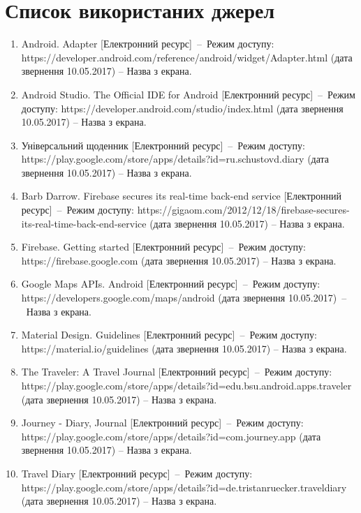 \documentclass[../main.tex]{subfiles}
\begin{document}
\chapter*{Список використаних джерел}
	
\begin{enumerate}
	\item Android. Adapter [Електронний ресурс]~–~Режим доступу: https://developer.android.com/reference/android/widget/Adapter.html (дата звернення 10.05.2017) – Назва з екрана.
	\item Android Studio. The Official IDE for Android [Електронний ресурс]~–~Режим доступу: https://developer.android.com/studio/index.html (дата звернення 10.05.2017) – Назва з екрана.
	\item Універсальний щоденник [Електронний ресурс]~–~Режим доступу: https://play.google.com/store/apps/details?id=ru.schustovd.diary (дата звернення 10.05.2017) – Назва з екрана.
	\item Barb Darrow. Firebase secures its real-time back-end service [Електронний ресурс]~–~Режим доступу: https://gigaom.com/2012/12/18/firebase-secures-its-real-time-back-end-service (дата звернення 10.05.2017) – Назва з екрана.
	\item Firebase. Getting started [Електронний ресурс]~–~Режим доступу: https://firebase.google.com (дата звернення 10.05.2017) – Назва з екрана.
	\item Google Maps APIs. Android [Електронний ресурс]~–~Режим доступу: https://developers.google.com/maps/android (дата звернення 10.05.2017)~–~Назва з екрана.
	\item Material Design. Guidelines [Електронний ресурс]~–~Режим доступу: https://material.io/guidelines (дата звернення 10.05.2017) – Назва з екрана.
	\item The Traveler: A Travel Journal [Електронний ресурс]~–~Режим доступу: https://play.google.com/store/apps/details?id=edu.bsu.android.apps.traveler (дата звернення 10.05.2017) – Назва з екрана.
	\newpage
	\item Journey - Diary, Journal [Електронний ресурс]~–~Режим доступу: https://play.google.com/store/apps/details?id=com.journey.app (дата звернення 10.05.2017) – Назва з екрана.
	\item Travel Diary [Електронний ресурс]~–~Режим доступу: https://play.google.com/store/apps/details?id=de.tristanruecker.traveldiary (дата звернення 10.05.2017) – Назва з екрана.	

\end{enumerate}
\end{document}
